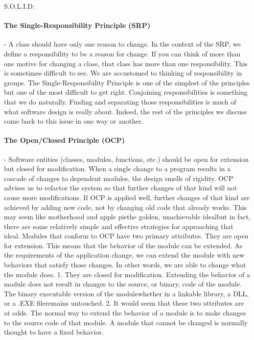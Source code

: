 \documentclass{llncs}
\begin{document}
S.O.L.I.D:
\paragraph{The Single-Responsibility Principle (SRP)} - A class should have only one reason to change.
In the context of the SRP, we define a responsibility to be a reason for change.
If you can think of more than one motive for changing a class, that class has more than one responsibility.
This is sometimes difficult to see. We are accustomed to thinking of responsibility in groups. 
The Single-Responsibility Principle is one of the simplest of the principles but one of the most difficult to get right.
Conjoining responsibilities is something that we do naturally.
Finding and separating those responsibilities is much of what software design is really about.
Indeed, the rest of the principles we discuss come back to this issue in one way or another.

\paragraph{The Open/Closed Principle (OCP)} - Software entities (classes, modules, functions, etc.) should be open for extension but
closed for modification.
When a single change to a program results in a cascade of changes to dependent modules, the design smells of rigidity. 
OCP advises us to refactor the system so that further changes of that kind will not cause more modifications. 
If OCP is applied well, further changes of that kind are achieved by adding new code, not by changing old code that already works. 
This may seem like motherhood and apple piethe golden, unachievable idealbut in fact, there are some relatively simple and effective
strategies for approaching that ideal.
Modules that conform to OCP have two primary attributes.
They are open for extension. This means that the behavior of the module can be extended.
As the requirements of the application change, we can extend the module with new behaviors that satisfy those changes. 
In other words, we are able to change what the module does.
1. They are closed for modification. Extending the behavior of a module does not result in changes to the source, or binary, code of the module.
The binary executable version of the modulewhether in a linkable library, a DLL, or a .EXE fileremains untouched.
2. It would seem that these two attributes are at odds. 
The normal way to extend the behavior of a module is to make changes to the source code of that module. 
A module that cannot be changed is normally thought to have a fixed behavior.
\end{document}

